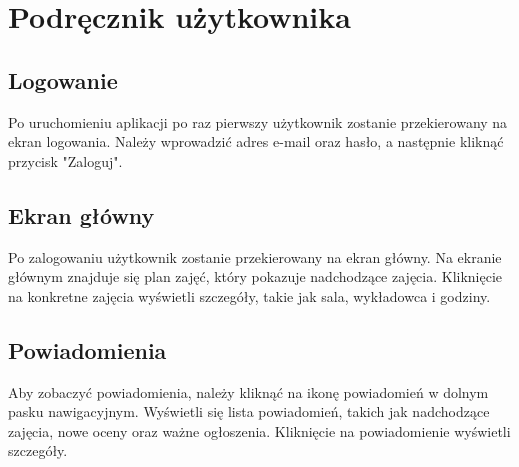 \newpage
\section{Podręcznik użytkownika}  %
\subsection{Logowanie}

Po uruchomieniu aplikacji po raz pierwszy użytkownik zostanie przekierowany na ekran logowania. Należy wprowadzić adres e-mail oraz hasło, a następnie kliknąć przycisk "Zaloguj".


\subsection{Ekran główny}

Po zalogowaniu użytkownik zostanie przekierowany na ekran główny. Na ekranie głównym znajduje się plan zajęć, który pokazuje nadchodzące zajęcia. Kliknięcie na konkretne zajęcia wyświetli szczegóły, takie jak sala, wykładowca i godziny.


\subsection{Powiadomienia}

Aby zobaczyć powiadomienia, należy kliknąć na ikonę powiadomień w dolnym pasku nawigacyjnym. Wyświetli się lista powiadomień, takich jak nadchodzące zajęcia, nowe oceny oraz ważne ogłoszenia. Kliknięcie na powiadomienie wyświetli szczegóły.


